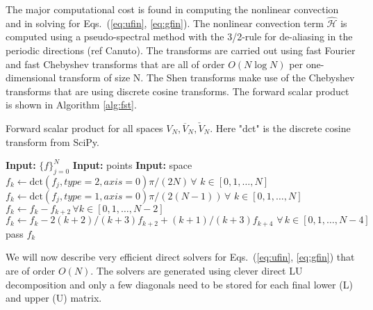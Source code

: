 \documentclass[11pt, oneside]{article}
\newcommand{\N}[1]{\check{#1}}
\newcommand{\D}[1]{\overline{#1}}
\begin{document}
The major computational cost is found in computing the nonlinear convection and 
in solving for Eqs.~(\ref{eq:ufin}, \ref{eq:gfin}). The nonlinear convection 
term $\bm{\hat{\mathcal{H}}}$ is computed using a pseudo-spectral method with 
the 3/2-rule for de-aliasing in the periodic directions (ref Canuto). The 
transforms are carried out using fast Fourier and fast Chebyshev transforms 
that are all of order $O(N\log N)$ per one-dimensional transform of size 
N. The Shen transforms make use of the Chebyshev transforms that are using 
discrete cosine transforms. The forward scalar product is shown in Algorithm 
\ref{alg:fst}.
\begin{algorithm}
	\caption{Forward scalar product for all spaces $V_N, \D{V}_N, \N{V}_N$. 
	Here "dct" is the discrete cosine transform from SciPy.}
	\label{alg:fst}
	\begin{algorithmic}[1]
		\State \textbf{Input:} $\{f\}_{j=0}^{N}$
		\State \textbf{Input:} points
		\State \textbf{Input:} space
			\State $f_k \gets \text{dct}(f_j, type=2, axis=0)\pi/(2 N)\, 
			\forall \, \, k \in 
			[0, 1, \ldots, N]$
		    \State $f_k \gets \text{dct}(f_j, type=1, axis=0)\pi/(2 (N-1))\, 
		    \forall \, \, k 
		    \in [0, 1, \ldots, N]$
	    \EndIf
	    \If{ space = $\D{V}_N$}
	        \State $f_k \gets f_k - f_{k+2} \, \forall k \in [0, 1, \ldots, 
	        N-2]$
	    \ElsIf{ space = $\N{V}_N$}	                
	        \State $f_k \gets f_k - 2(k+2)/(k+3)f_{k+2} + (k+1)/(k+3)f_{k+4} 
	        \,\, 
	        \forall \, k \in [0, 1, \ldots, N-4]$
	    \Else{}
	        \State pass
	    \EndIf
\State \Return $f_k$    
	\end{algorithmic}
\end{algorithm}

We will now describe very efficient direct solvers for Eqs.~(\ref{eq:ufin}, 
\ref{eq:gfin}) that are of order $O(N)$. The solvers are generated using clever 
direct LU decomposition and only a few diagonals need to be stored for each 
final lower (L) and upper (U) matrix. 
\end{document}
